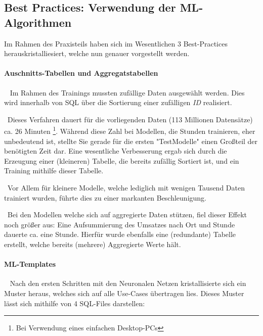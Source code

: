 \subsection{Best Practices: Verwendung der ML-Algorithmen}
Im Rahmen des Praxisteils haben sich im Wesentlichen 3 Best-Practices herauskristalliesiert, welche nun genauer vorgestellt werden. 

\paragraph{Auschnitts-Tabellen und Aggregatstabellen} ~\newline
Im Rahmen des Trainings mussten zufällige Daten ausgewählt werden. Dies wird innerhalb von SQL über die Sortierung einer zufälligen \textit{ID} realisiert. 

~\newline Dieses Verfahren dauert für die vorliegenden Daten (113 Millionen Datensätze) ca. 26 Minuten \footnote{Bei Verwendung eines einfachen Desktop-PCs}. Während diese Zahl bei Modellen, die Stunden trainieren, eher unbedeutend ist, stellte Sie gerade für die ersten "TestModelle" einen Großteil der benötigten Zeit dar. Eine wesentliche Verbesserung ergab sich durch die Erzeugung einer (kleineren) Tabelle, die bereits zufällig Sortiert ist, und ein Training mithilfe dieser Tabelle. 

~\newline Vor Allem für kleinere Modelle, welche lediglich mit wenigen Tausend Daten trainiert wurden, führte dies zu einer markanten Beschleunigung.

~\newline Bei den Modellen welche sich auf aggregierte Daten stützen, fiel dieser Effekt noch größer aus: Eine Aufsummierung des Umsatzes nach Ort und Stunde dauerte ca. eine Stunde. Hierfür wurde ebenfalls eine (redundante) Tabelle erstellt, welche bereits (mehrere) Aggregierte Werte hält. 

\paragraph{ML-Templates} ~\newline
Nach den ersten Schritten mit den Neuronalen Netzen kristallisierte sich ein Muster heraus, welches sich auf alle Use-Cases übertragen lies. Dieses Muster lässt sich mithilfe von 4 SQL-Files darstellen:

